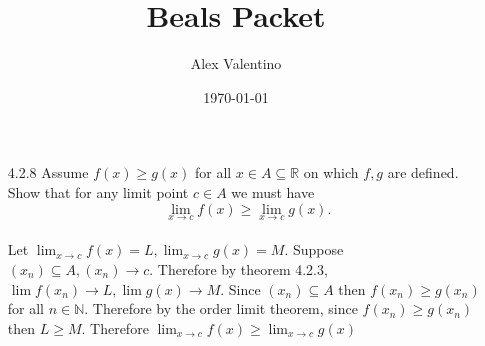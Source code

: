 \documentclass[12pt, letterpaper]{article}
\date{\today}
\author{Alex Valentino}
\title{Beals Packet}
\newcommand{\N}{\mathbb{N}}
\newcommand{\R}{\mathbb{R}}
\begin{document}
\begin{enumerate}
	\item[4.2.8] Assume $f(x) \geq g(x)$ for all $x \in A \subseteq \R$ on which $f,g$ are defined.  Show that for any limit point $c \in A$ we must have
	$$
		\lim_{x\to c} f(x) \geq \lim_{x\to c} g(x).
	$$\\
	Let $\lim_{x \to c} f(x) = L, \lim_{x \to c} g(x) = M$.  Suppose $(x_n) \subseteq A, (x_n) \to c$.  Therefore by theorem 4.2.3, $\lim f(x_n) \to L, \lim g(x) \to M$.  Since $(x_n) \subseteq A$ then $f(x_n) \geq g(x_n)$ for all $n \in \N$.  Therefore by the order limit theorem, since $f(x_n) \geq g(x_n)$ then $L \geq M$.  Therefore $\lim_{x\to c} f(x) \geq \lim_{x\to c} g(x)$
\end{enumerate}
\end{document}

